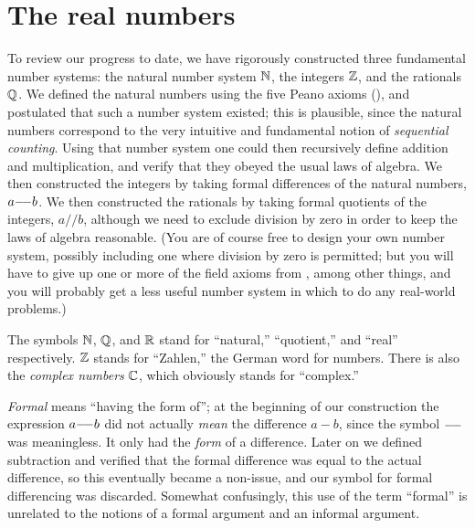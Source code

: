 \chapter{The real numbers}\label{i:ch:5}

\begin{note}
  To review our progress to date, we have rigorously constructed three fundamental number systems:
  the natural number system \(\mathbb{N}\), the integers \(\mathbb{Z}\), and the rationals \(\mathbb{Q}\).
  We defined the natural numbers using the five Peano axioms (), and postulated that such a number system existed;
  this is plausible, since the natural numbers correspond to the very intuitive and fundamental notion of \emph{sequential counting}.
  Using that number system one could then recursively define addition and multiplication, and verify that they obeyed the usual laws of algebra.
  We then constructed the integers by taking formal differences of the natural numbers, \(a {-}\!{-} b\).
  We then constructed the rationals by taking formal quotients of the integers, \(a // b\), although we need to exclude division by zero in order to keep the laws of algebra reasonable.
  (You are of course free to design your own number system, possibly including one where division by zero is permitted;
  but you will have to give up one or more of the field axioms from , among other things, and you will probably get a less useful number system in which to do any real-world problems.)
\end{note}

\begin{note}
  The symbols \(\mathbb{N}\), \(\mathbb{Q}\), and \(\mathbb{R}\) stand for ``natural,'' ``quotient,'' and ``real'' respectively.
  \(\mathbb{Z}\) stands for ``Zahlen,'' the German word for numbers.
  There is also the \emph{complex numbers} \(\mathbb{C}\), which obviously stands for ``complex.''
\end{note}

\begin{note}
  \emph{Formal} means ``having the form of'';
  at the beginning of our construction the expression \(a {-}\!{-} b\) did not actually \emph{mean} the difference \(a - b\), since the symbol \({-}\!{-}\) was meaningless.
  It only had the \emph{form} of a difference.
  Later on we defined subtraction and verified that the formal difference was equal to the actual difference, so this eventually became a non-issue, and our symbol for formal differencing was discarded.
  Somewhat confusingly, this use of the term ``formal'' is unrelated to the notions of a formal argument and an informal argument.
\end{note}

